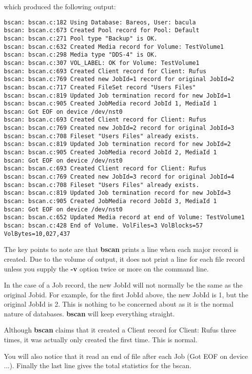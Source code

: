which produced the following output:

\footnotesize
\begin{verbatim}
bscan: bscan.c:182 Using Database: Bareos, User: bacula
bscan: bscan.c:673 Created Pool record for Pool: Default
bscan: bscan.c:271 Pool type "Backup" is OK.
bscan: bscan.c:632 Created Media record for Volume: TestVolume1
bscan: bscan.c:298 Media type "DDS-4" is OK.
bscan: bscan.c:307 VOL_LABEL: OK for Volume: TestVolume1
bscan: bscan.c:693 Created Client record for Client: Rufus
bscan: bscan.c:769 Created new JobId=1 record for original JobId=2
bscan: bscan.c:717 Created FileSet record "Users Files"
bscan: bscan.c:819 Updated Job termination record for new JobId=1
bscan: bscan.c:905 Created JobMedia record JobId 1, MediaId 1
bscan: Got EOF on device /dev/nst0
bscan: bscan.c:693 Created Client record for Client: Rufus
bscan: bscan.c:769 Created new JobId=2 record for original JobId=3
bscan: bscan.c:708 Fileset "Users Files" already exists.
bscan: bscan.c:819 Updated Job termination record for new JobId=2
bscan: bscan.c:905 Created JobMedia record JobId 2, MediaId 1
bscan: Got EOF on device /dev/nst0
bscan: bscan.c:693 Created Client record for Client: Rufus
bscan: bscan.c:769 Created new JobId=3 record for original JobId=4
bscan: bscan.c:708 Fileset "Users Files" already exists.
bscan: bscan.c:819 Updated Job termination record for new JobId=3
bscan: bscan.c:905 Created JobMedia record JobId 3, MediaId 1
bscan: Got EOF on device /dev/nst0
bscan: bscan.c:652 Updated Media record at end of Volume: TestVolume1
bscan: bscan.c:428 End of Volume. VolFiles=3 VolBlocks=57 VolBytes=10,027,437
\end{verbatim}
\normalsize

The key points to note are that {\bf bscan} prints a line when each major
record is created. Due to the volume of output, it does not print a line for
each file record unless you supply the {\bf -v} option twice or more on the
command line.

In the case of a Job record, the new JobId will not normally be the same as
the original Jobid. For example, for the first JobId above, the new JobId is
1, but the original JobId is 2. This is nothing to be concerned about as it is
the normal nature of databases. {\bf bscan} will keep everything straight.

Although {\bf bscan} claims that it created a Client record for Client: Rufus
three times, it was actually only created the first time. This is normal.

You will also notice that it read an end of file after each Job (Got EOF on
device ...). Finally the last line gives the total statistics for the bscan.

